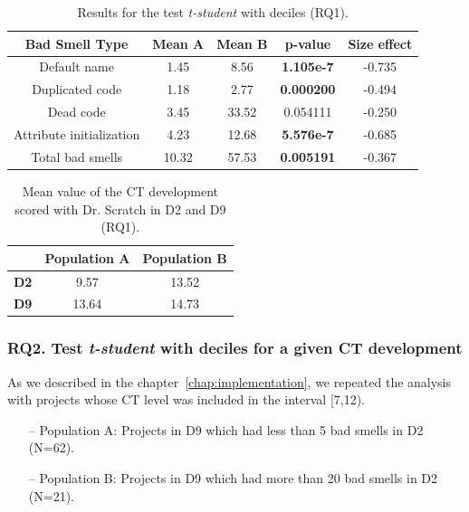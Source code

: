 \begin{table}
 \begin{center}
  \begin{tabular}{|c|c|c|c|c|}
    \hline
    \textbf{Bad Smell Type} & \textbf{Mean A} & \textbf{Mean B} & \textbf{p-value} & \textbf{Size effect} \\ \hline
    Default name & 1.45 & 8.56 & \textbf{1.105e-7} & -0.735 \\ \hline
    Duplicated code & 1.18 & 2.77 & \textbf{0.000200} & -0.494 \\ \hline
    Dead code & 3.45 & 33.52 & 0.054111 & -0.250 \\ \hline
    Attribute initialization & 4.23 & 12.68 & \textbf{5.576e-7} & -0.685 \\ \hline
    Total bad smells & 10.32 & 57.53 & \textbf{0.005191} & -0.367 \\ \hline
  \end{tabular}
  \caption{Results for the test \textit{t-student} with deciles (RQ1).}
  \label{table:rq1_statistical_results}
 \end{center}
\end{table}

\begin{table}
 \begin{center}
  \begin{tabular}{|c|c|c|}
    \hline
     & \textbf{Population A} & \textbf{Population B} \\ \hline
    \textbf{D2} & 9.57 & 13.52 \\ \hline
    \textbf{D9} & 13.64 & 14.73 \\ \hline
  \end{tabular}
  \caption{Mean value of the CT development scored with Dr. Scratch in D2 and D9 (RQ1).}
  \label{table:rq1_statistical_results_mean}
 \end{center}
\end{table}



\subsubsection{RQ2. Test \textit{t-student} with deciles for a given CT development}
\label{subsubsec:rq2_statistical_results}

As we described in the chapter~\ref{chap:implementation}, we repeated the analysis with projects whose CT level was included in the interval [7,12). 

\begin{itemize}
    \item[--] Population A: Projects in D9 which had less than 5 bad smells in D2 (N=62).
    \item[--] Population B: Projects in D9 which had more than 20 bad smells in D2 (N=21).
\end{itemize}

